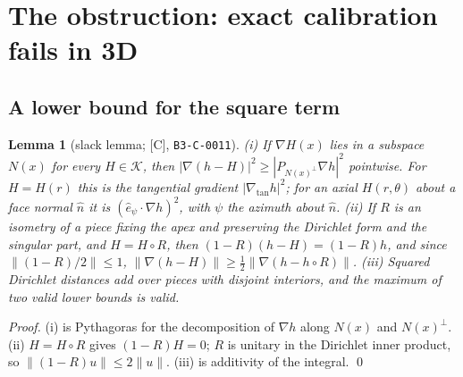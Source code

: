 \documentclass[10pt]{article}
\newcommand{\tier}[1]{\textsf{[#1]}}
\newcommand{\cid}[1]{\texttt{B3-#1}}
\newtheorem{lemma}{Lemma}
\theoremstyle{remark}
\begin{document}
\section{The obstruction: exact calibration fails in 3D}\label{sec:obstruction}
\subsection{A lower bound for the square term}
\begin{lemma}[slack lemma; \tier{C}, \cid{C-0011}]\label{lem:slack}
(i) If $\nabla H(x)$ lies in a subspace $N(x)$ for every $H\in\mathcal K$, then $|\nabla(h-H)|^2\ge|P_{N(x)^\perp}\nabla h|^2$ pointwise. For $H=H(r)$ this is the tangential gradient
$|\nabla_{\tan}h|^2$; for an axial $H(r,\theta)$ about a face normal $\hat n$ it is $(\hat e_\psi\!\cdot\!\nabla h)^2$, with $\psi$ the azimuth about $\hat n$.
(ii) If $R$ is an isometry of a piece fixing the apex and preserving the Dirichlet form and the singular part, and $H=H\circ R$, then $(1-R)(h-H)=(1-R)h$, and since $\|(1-R)/2\|\le1$,
$\|\nabla(h-H)\|\ge\tfrac12\|\nabla(h-h\circ R)\|$.
(iii) Squared Dirichlet distances add over pieces with disjoint interiors, and the maximum of two valid lower bounds is valid.
\end{lemma}
\emph{Proof.} (i) is Pythagoras for the decomposition of $\nabla h$ along $N(x)$ and $N(x)^\perp$. (ii) $H=H\circ R$ gives $(1-R)H=0$; $R$ is unitary in the Dirichlet inner product, so $\|(1-R)u\|\le2\|u\|$. (iii) is additivity of the integral. \qed
\end{document}

